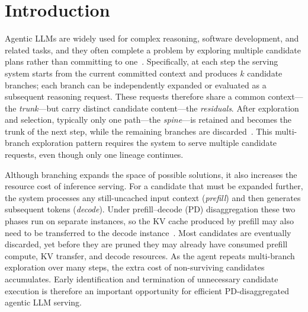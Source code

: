 \section{Introduction}
\label{sec:intro}

Agentic LLMs are widely used for complex reasoning, software development, and related tasks, and they often complete a problem by exploring multiple candidate plans rather than committing to one~\cite{react,sweagent,openhands,tot,selfconsistency,cot}.
Specifically, at each step the serving system starts from the current committed context and produces $k$ candidate branches; each branch can be independently expanded or evaluated as a subsequent reasoning request.
These requests therefore share a common context---the \emph{trunk}---but carry distinct candidate content---the \emph{residuals}.
After exploration and selection, typically only one path---the \emph{spine}---is retained and becomes the trunk of the next step, while the remaining branches are discarded~\cite{gsm8k,math,esc}.
This multi-branch exploration pattern requires the system to serve multiple candidate requests, even though only one lineage continues.

Although branching expands the space of possible solutions, it also increases the resource cost of inference serving.
For a candidate that must be expanded further, the system processes any still-uncached input context (\emph{prefill}) and then generates subsequent tokens (\emph{decode}).
Under prefill--decode (PD) disaggregation these two phases run on separate instances, so the KV cache produced by prefill may also need to be transferred to the decode instance~\cite{distserve,splitwise}.
Most candidates are eventually discarded, yet before they are pruned they may already have consumed prefill compute, KV transfer, and decode resources.
As the agent repeats multi-branch exploration over many steps, the extra cost of non-surviving candidates accumulates.
Early identification and termination of unnecessary candidate execution is therefore an important opportunity for efficient PD-disaggregated agentic LLM serving.

